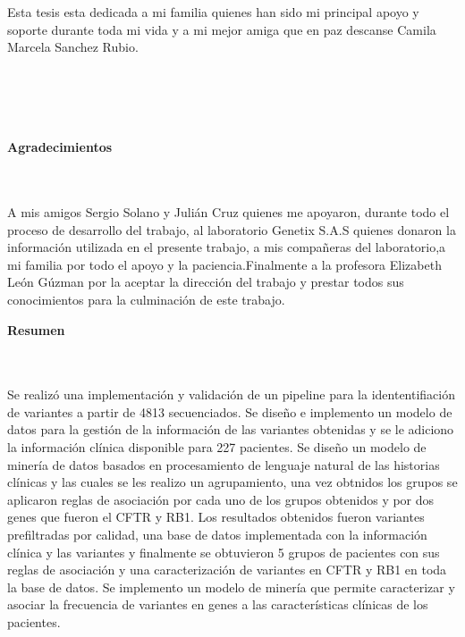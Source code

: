 \begin{flushright}
\begin{minipage}{8cm}
    \noindent
        Esta tesis esta dedicada a mi familia quienes han sido mi principal apoyo y soporte durante toda mi vida y a mi mejor amiga que en paz descanse Camila Marcela Sanchez Rubio.\\[1.0cm]\\
      \end{minipage}
\end{flushright}

\newpage{\pagestyle{empty}\cleardoublepage}

\newpage
\thispagestyle{empty} \textbf{}\normalsize
\\\\\\%
\textbf{\LARGE Agradecimientos}
\\\\
A mis amigos Sergio Solano y Julián Cruz quienes me apoyaron, durante todo el proceso de desarrollo del trabajo, al laboratorio Genetix S.A.S quienes donaron la información utilizada en el presente trabajo, a mis compañeras del laboratorio,a mi familia por todo el apoyo y la paciencia.Finalmente a la profesora Elizabeth León Gúzman por la aceptar la dirección del trabajo y prestar todos sus conocimientos para la culminación de este trabajo. \\

\newpage{\pagestyle{empty}\cleardoublepage}

\newpage
\textbf{\LARGE Resumen}
\\\\
Se realizó una implementación y validación de un pipeline para la idententifiación de variantes a partir de 4813 secuenciados. Se diseño e implemento un modelo de datos para la gestión de la información de las variantes obtenidas y se le adiciono la información clínica disponible para 227 pacientes. Se diseño un modelo de minería de datos basados en procesamiento de lenguaje natural de las historias clínicas y las cuales se les realizo un agrupamiento, una vez obtnidos los grupos se aplicaron reglas de asociación por cada uno de los grupos obtenidos y por dos genes que fueron el CFTR y RB1. Los resultados obtenidos fueron variantes prefiltradas por calidad, una base de datos implementada con la información clínica y las variantes y finalmente se obtuvieron 5 grupos de pacientes con sus reglas de asociación y una caracterización de variantes en CFTR y RB1 en toda la base de datos. Se implemento un modelo de minería que permite caracterizar y asociar la frecuencia de variantes en genes a las características clínicas de los pacientes. \\

